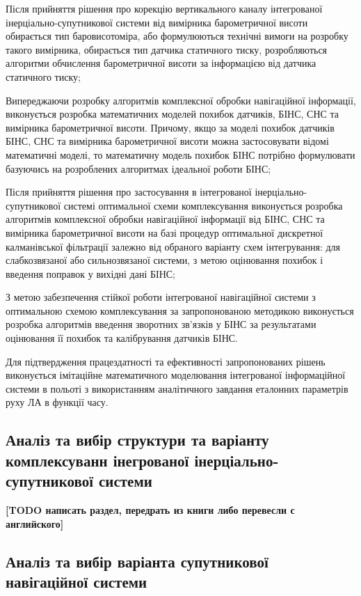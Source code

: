 Після прийняття рішення про корекцію вертикального каналу інтегрованої 
інерціально-супутникової системи від вимірника барометричної висоти обирається 
тип баровисотоміра, або формулюються технічні вимоги на розробку такого 
вимірника, обирається тип датчика статичного тиску, розробляються алгоритми 
обчислення барометричної висоти за інформацією від датчика статичного тиску;

Випереджаючи розробку алгоритмів комплексної обробки навігаційної 
інформації, виконується розробка математичних моделей похибок датчиків, 
БІНС, СНС та вимірника барометричної висоти. Причому, якщо за моделі 
похибок датчиків БІНС, СНС та вимірника барометричної висоти можна 
застосовувати відомі математичні моделі, то математичну модель похибок 
БІНС потрібно формулювати базуючись на розроблених алгоритмах ідеальної 
роботи БІНС;

Після прийняття рішення про застосування в інтегрованої інерціально-супутникової 
системі оптимальної схеми комплексування виконується розробка алгоритмів 
комплексної обробки навігаційної інформації від БІНС, СНС та вимірника 
барометричної висоти на базі процедур оптимальної дискретної калманівської 
фільтрації залежно від обраного варіанту схем інтегрування: для слабкозвязаної 
або сильнозвязаної системи, з метою оцінювання похибок і введення поправок у 
вихідні дані БІНС;

З метою забезпечення стійкої роботи інтегрованої навігаційної системи з 
оптимальною схемою комплексування за запропонованою методикою викону­ється 
розробка алгоритмів введення зворотних зв’язків у БІНС за результатами 
оцінювання її похибок та калібрування датчиків БІНС.

Для підтвердження працездатно­сті та ефективності запропонованих рішень 
виконується імітаційне математичного моделювання інтегрова­ної інформаційної 
системи в польоті з використанням аналітичного завдання еталонних параметрів 
руху ЛА в функції часу.

\subsection{Аналіз та вибір структури та варіанту комплексуванн інегрованої
інерціально-супутникової системи}

\textbf{[TODO написать раздел, передрать из книги либо перевесли с английского]}

\subsection{Аналіз та вибір варіанта супутникової навігаційної системи}

